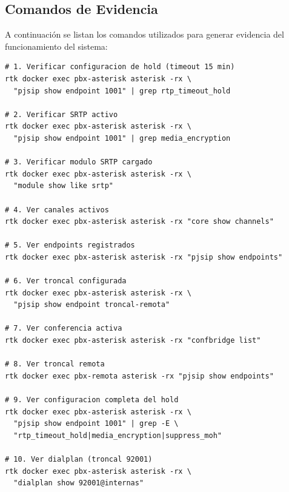 \documentclass[12pt,a4paper]{article}
\begin{document}
\subsection{Comandos de Evidencia}

A continuación se listan los comandos utilizados para generar evidencia del funcionamiento del sistema:

\begin{lstlisting}
# 1. Verificar configuracion de hold (timeout 15 min)
rtk docker exec pbx-asterisk asterisk -rx \
  "pjsip show endpoint 1001" | grep rtp_timeout_hold

# 2. Verificar SRTP activo
rtk docker exec pbx-asterisk asterisk -rx \
  "pjsip show endpoint 1001" | grep media_encryption

# 3. Verificar modulo SRTP cargado
rtk docker exec pbx-asterisk asterisk -rx \
  "module show like srtp"

# 4. Ver canales activos
rtk docker exec pbx-asterisk asterisk -rx "core show channels"

# 5. Ver endpoints registrados
rtk docker exec pbx-asterisk asterisk -rx "pjsip show endpoints"

# 6. Ver troncal configurada
rtk docker exec pbx-asterisk asterisk -rx \
  "pjsip show endpoint troncal-remota"

# 7. Ver conferencia activa
rtk docker exec pbx-asterisk asterisk -rx "confbridge list"

# 8. Ver troncal remota
rtk docker exec pbx-remota asterisk -rx "pjsip show endpoints"

# 9. Ver configuracion completa del hold
rtk docker exec pbx-asterisk asterisk -rx \
  "pjsip show endpoint 1001" | grep -E \
  "rtp_timeout_hold|media_encryption|suppress_moh"

# 10. Ver dialplan (troncal 92001)
rtk docker exec pbx-asterisk asterisk -rx \
  "dialplan show 92001@internas"
\end{lstlisting}
\end{document}
